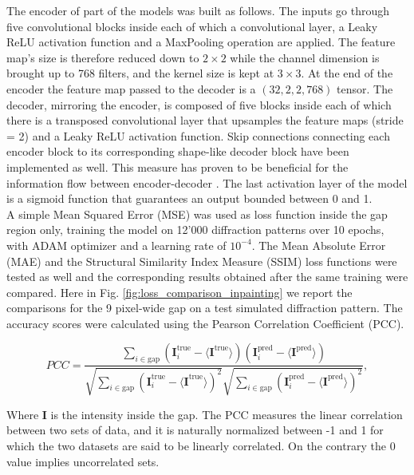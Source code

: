 The encoder of part of the models was built as follows. The inputs go through five convolutional blocks 
inside each of which a convolutional layer, a Leaky ReLU activation function and a MaxPooling operation are applied. 
The feature map's size is therefore reduced down to $2\times2$ while the channel dimension is brought up to 768 filters, 
and the kernel size is kept at $3\times3$. At the end of the encoder the feature map passed to the decoder is a 
$(32,2,2,768)$ tensor.
The decoder, mirroring the encoder, is composed of five blocks inside each of which there is a transposed convolutional layer
that upsamples the feature maps (stride = 2) and a Leaky ReLU activation function. Skip connections connecting each encoder block
to its corresponding shape-like decoder block have been implemented as well. This measure has proven to be beneficial 
for the information flow between encoder-decoder \cite{li_visualizing_2017}. The last activation layer of the model is 
a sigmoid function that guarantees an output bounded between 0 and 1. \\ 

A simple Mean Squared Error (MSE) was used as loss function inside the gap region only, training 
the model on 12'000 diffraction patterns over 10 epochs, with ADAM optimizer and a learning rate of $10^{-4}$. 
The Mean Absolute Error (MAE) and the Structural Similarity Index Measure (SSIM) \cite{ssim} loss functions were 
tested as well and the corresponding results obtained after the same training were compared.
Here in Fig. \ref{fig:loss_comparison_inpainting} we report the comparisons for the 9 pixel-wide gap on a test simulated diffraction
pattern. The accuracy scores were calculated using the Pearson Correlation Coefficient (PCC).

\begin{equation}
    PCC = \frac{\sum_{i\in \text{gap}}(\textbf{I}_i^{\text{true}} - 
    \langle \textbf{I}^{\text{true}}\rangle)(\textbf{I}_i^{\text{pred}}-
    \langle\textbf{I}^{\text{pred}}\rangle)}{\sqrt{\sum_{i\in \text{gap}}^{}(\textbf{I}_i^{\text{true}} - 
    \langle \textbf{I}^{\text{true}}\rangle)^2}\sqrt{\sum_{i\in \text{gap}}^{}(\textbf{I}_i^{\text{pred}}-
    \langle\textbf{I}^{\text{pred}}\rangle)^2}},
        \label{eq:accuracy}
\end{equation}

Where \textbf{I} is the intensity inside the gap. The PCC measures the linear correlation between two sets of data, 
and it is naturally normalized between -1 and 1 for which the two datasets are said to be linearly correlated. On the 
contrary the 0 value implies uncorrelated sets. 

